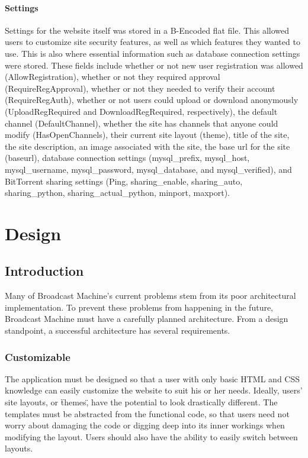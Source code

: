 \documentclass[a4paper,12pt]{report}
\begin{document}
\subsubsection{Settings}
Settings for the website itself was stored in a B-Encoded flat file. This allowed users to customize site security features, as well as which features they wanted to use. This is also where essential information such as database connection settings were stored. These fields include whether or not new user registration was allowed (AllowRegistration), whether or not they required approval (RequireRegApproval), whether or not they needed to verify their account (RequireRegAuth), whether or not users could upload or download anonymously (UploadRegRequired and DownloadRegRequired, respectively), the default channel (DefaultChannel), whether the site has channels that anyone could modify (HasOpenChannels), their current site layout (theme), title of the site, the site description, an image associated with the site, the base url for the site (baseurl), database connection settings (mysql\_prefix, mysql\_host, mysql\_username, mysql\_password, mysql\_database, and mysql\_verified), and BitTorrent sharing settings (Ping, sharing\_enable, sharing\_auto, sharing\_python, sharing\_actual\_python, minport, maxport).

\chapter{Design}

\section{Introduction}
Many of Broadcast Machine's current problems stem from its poor architectural implementation. 
To prevent these problems from happening in the future, Broadcast Machine must have a carefully planned architecture. 
From a design standpoint, a successful architecture has several requirements. 


\subsection{Customizable} 
The application must be designed so that a user with only basic HTML and CSS knowledge can easily customize the website to suit his or her needs. 
Ideally, users' site layouts, or \"themes\", have the potential to look drastically different. 
The templates must be abstracted from the functional code, so that users need not worry about damaging the code or digging deep into its inner workings when modifying the layout. 
Users should also have the ability to easily switch between layouts. 
\end{document}
